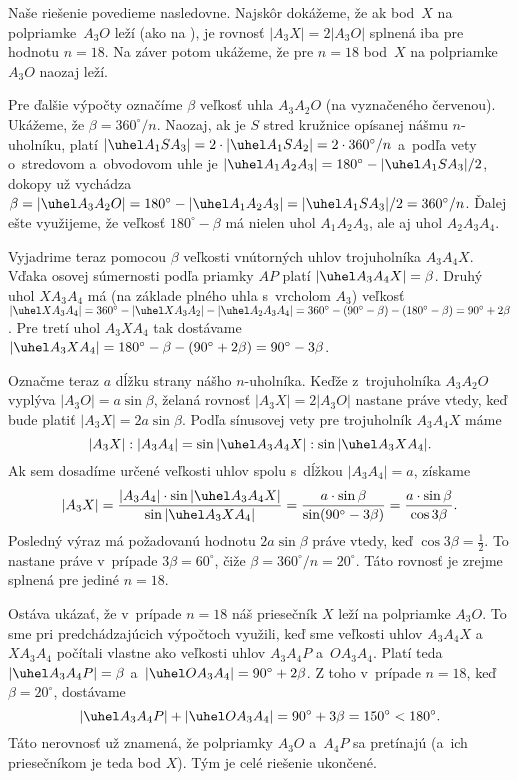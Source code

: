 {Naše riešenie povedieme nasledovne. Najskôr dokážeme, že ak
bod~$X$ na polpriamke~$A_3O$ leží (ako na ), je
rovnosť $|A_3X|=2|A_3O|$ splnená iba pre hodnotu $n=18$.
Na záver potom ukážeme, že pre $n=18$ bod~$X$ na
polpriamke~$A_3O$ naozaj leží.

Pre ďalšie výpočty označíme $\beta$ veľkosť uhla $A_3A_2O$
(na  vyznačeného červenou). Ukážeme, že $\beta=360^{\circ}/n$.
Naozaj, ak je $S$ stred kružnice opísanej nášmu $n$-uholníku,
platí $|\uhel A_1SA_3|=2\cdot|\uhel A_1SA_2|=2\cdot360^{\circ}/n$
a~podľa vety o~stredovom a~obvodovom uhle je
$|\uhel A_1A_2A_3|=180^{\circ}-|\uhel A_1SA_3|/2$,
dokopy už vychádza $\beta=|\uhel A_3A_2O|={180^{\circ}-
|\uhel A_1A_2A_3|}=|\uhel A_1SA_3|/2=360^{\circ}/n$. Ďalej ešte
využijeme, že veľkosť $180^{\circ}-\beta$ má nielen uhol
$A_1A_2A_3$, ale aj uhol $A_2A_3A_4$.
%

Vyjadrime teraz pomocou $\beta$ veľkosti
vnútorných uhlov trojuholníka $A_3A_4X$. Vďaka osovej súmernosti
podľa priamky $AP$ platí $|\uhel A_3A_4X|=\beta$. Druhý uhol $XA_3A_4$
má (na základe plného uhla s~vrcholom $A_3$)
veľkosť $|\uhel XA_3A_4|= 360^{\circ}-
|\uhel XA_3A_2|-|\uhel A_2A_3A_4|=360^{\circ}-(90^{\circ}-\beta)-
(180^{\circ}-\beta)=90^{\circ}+2\beta$. Pre tretí uhol $A_3XA_4$
tak dostávame $|\uhel A_3XA_4|=180^{\circ}-\beta-(90^{\circ}+2\beta)=
90^{\circ}-3\beta$.

Označme teraz $a$ dĺžku strany nášho $n$-uholníka. Keďže
z~trojuholníka $A_3A_2O$ vyplýva $|A_3O|=a \sin \beta$, želaná rovnosť
$|A_3X|=2|A_3O|$ nastane práve vtedy, keď bude platiť
$|A_3X|=2a\sin\beta$. Podľa sínusovej vety pre trojuholník $A_3A_4X$
máme
$$
|A_3X|:|A_3A_4|=\sin|\uhel A_3A_4X|:\sin |\uhel A_3XA_4|.
$$
Ak sem dosadíme určené veľkosti uhlov spolu s~dĺžkou
$|A_3A_4|=a$, získame
$$
|A_3X|=\frac{|A_3A_4|\cdot\sin|\uhel A_3A_4X|}{\sin |\uhel
A_3XA_4|}=\frac{a\cdot\sin\beta}{\sin(90^{\circ}-3\beta)}
=\frac{a\cdot\sin\beta}{\cos3\beta}.
$$
Posledný výraz má požadovanú hodnotu $2a\sin\beta$ práve vtedy, keď
$\cos 3\beta=\frac12$. To nastane práve v~prípade
$3\beta=60^{\circ}$, čiže $\beta=360^{\circ}/n=20^{\circ}$.
Táto rovnosť je zrejme splnená pre jediné $n=18$.

Ostáva ukázať, že v~prípade $n=18$ náš priesečník $X$ leží na polpriamke
$A_3O$. To sme pri predchádzajúcich výpočtoch využili, keď sme
veľkosti uhlov $A_3A_4X$ a~$XA_3A_4$ počítali vlastne ako veľkosti uhlov
$A_3A_4P$ a~$OA_3A_4$. Platí teda $|\uhel A_3A_4P|=\beta$
a~$|\uhel OA_3A_4|=90^{\circ}+2\beta$. Z toho v~prípade $n=18$, keď
$\beta=20^{\circ}$, dostávame
$$
|\uhel A_3A_4P|+|\uhel OA_3A_4|=90^{\circ}+3\beta=150^{\circ}
<180^{\circ}.
$$
Táto nerovnosť už znamená, že polpriamky $A_3O$ a~$A_4P$ sa
pretínajú (a~ich priesečníkom je teda bod $X$).
Tým je celé riešenie ukončené.

}
